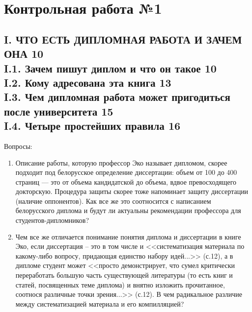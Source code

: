 \documentclass{../../common/thesisbyxetex}
\begin{document}
\chapter*{Контрольная работа №1}
\section*{I. \uppercase{Что есть дипломная работа и зачем она} 10 \\
I.1. Зачем пишут диплом и что он такое 10 \\
I.2. Кому адресована эта книга 13 \\
I.3. Чем дипломная работа может пригодиться после университета 15 \\
I.4. Четыре простейших правила 16}
Вопросы:
\begin{enumerate}
\item Описание работы, которую профессор Эко называет дипломом, скорее подходит под белорусское определение
диссертации: объем от 100 до 400 страниц --- это от объема кандидатской до объема, вдвое превосходящего докторскую.
Процедура защиты скорее тоже напоминает защиту диссертации (наличие оппонентов). Как все же это соотносится с написанием
белорусского диплома и будут ли актуальны рекомендации профессора для студентов-дипломников?

\item Чем все же отличается понимание понятия диплома и диссертации в книге Эко, если диссертация – это в том числе и
<<систематизация материала по какому-либо вопросу, придающая единство набору идей...>> (с.12), а в дипломе студент
может <<просто демонстрирует, что сумел критически переработать большую часть существующей литературы (то есть книг и
статей, посвященных теме диплома) и внятно изложить прочитанное, соотнося различные точки зрения...>> (с.12). В чем
радикальное различие между систематизацией материала и его компилляцией?
\end{enumerate}
\end{document}
